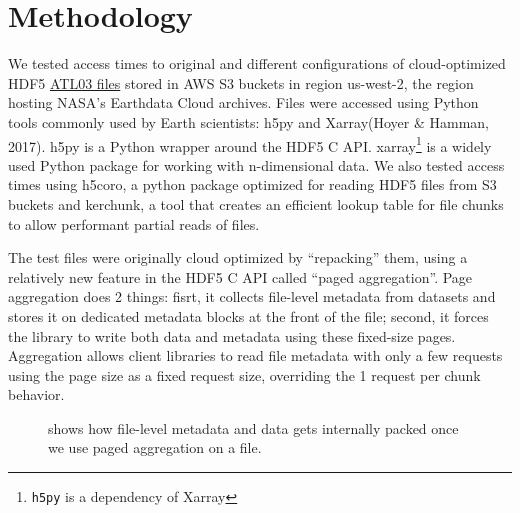 \documentclass[
]{agujournal2019}
\begin{document}
\section{Methodology}\label{methodology}

We tested access times to original and different configurations of
cloud-optimized HDF5
\href{https://its-live-data.s3.amazonaws.com/index.html\#test-space/cloud-experiments/h5cloud/}{ATL03
files} stored in AWS S3 buckets in region us-west-2, the region hosting
NASA's Earthdata Cloud archives. Files were accessed using Python tools
commonly used by Earth scientists: h5py and Xarray(Hoyer \& Hamman,
2017). h5py is a Python wrapper around the HDF5 C API. xarray\footnote{\texttt{h5py}
  is a dependency of Xarray} is a widely used Python package for working
with n-dimensional data. We also tested access times using h5coro, a
python package optimized for reading HDF5 files from S3 buckets and
kerchunk, a tool that creates an efficient lookup table for file chunks
to allow performant partial reads of files.

The test files were originally cloud optimized by ``repacking'' them,
using a relatively new feature in the HDF5 C API called ``paged
aggregation''. Page aggregation does 2 things: fisrt, it collects
file-level metadata from datasets and stores it on dedicated metadata
blocks at the front of the file; second, it forces the library to write
both data and metadata using these fixed-size pages. Aggregation allows
client libraries to read file metadata with only a few requests using
the page size as a fixed request size, overriding the 1 request per
chunk behavior.

\begin{figure}


\caption{\label{fig-2}shows how file-level metadata and data gets
internally packed once we use paged aggregation on a file.}

\end{figure}%
\end{document}
